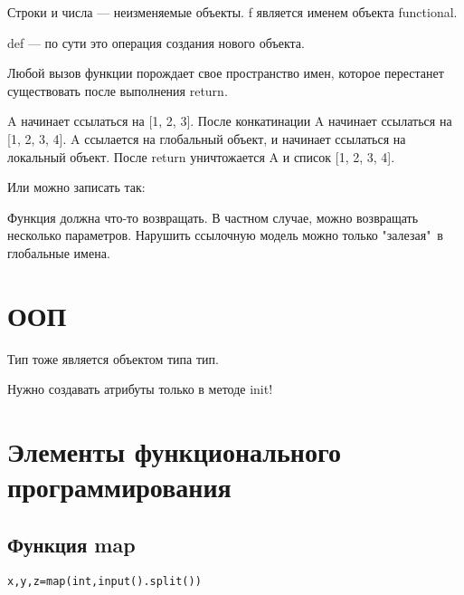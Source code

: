 Строки и числа --- неизменяемые объекты.
f является именем объекта functional.

def --- по сути это операция создания нового объекта.

Любой вызов функции порождает свое пространство имен, которое перестанет существовать после выполнения return. 

A начинает ссылаться на [1, 2, 3]. После конкатинации A начинает ссылаться на [1, 2, 3, 4]. A ссылается на глобальный объект, и начинает ссылаться на локальный объект. После return уничтожается A и список [1, 2, 3, 4].

Или можно записать так:

Функция должна что-то возвращать. В частном случае, можно возвращать несколько параметров. Нарушить ссылочную модель можно только "залезая"\ в глобальные имена.








\section{ООП}
Тип тоже является объектом типа тип. 


Нужно создавать атрибуты только в методе init!

\section{Элементы функционального программирования}

\subsection{Функция map}
\begin{alltt}
x, y, z = map(int, input().split()) 
\end{alltt}

